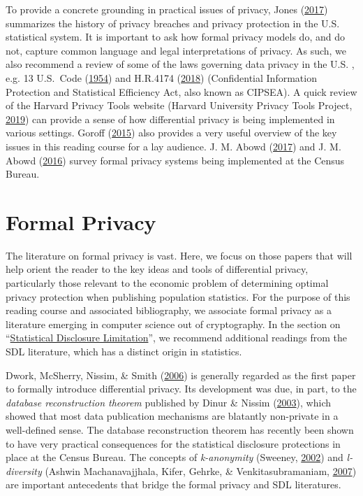 \documentclass[]{article}
\begin{document}
To provide a concrete grounding in practical issues of privacy, Jones
(\protect\hyperlink{ref-jones:2017}{2017}) summarizes the history of
privacy breaches and privacy protection in the U.S. statistical system.
It is important to ask how formal privacy models do, and do not, capture
common language and legal interpretations of privacy. As such, we also
recommend a review of some of the laws governing data privacy in the
U.S. , e.g. 13 U.S.~Code (\protect\hyperlink{ref-title13}{1954}) and
H.R.4174 (\protect\hyperlink{ref-cipsea}{2018}) (Confidential
Information Protection and Statistical Efficiency Act, also known as
CIPSEA). A quick review of the Harvard Privacy Tools website (Harvard
University Privacy Tools Project,
\protect\hyperlink{ref-Harvard:PrivacyTools}{2019}) can provide a sense
of how differential privacy is being implemented in various settings.
Goroff (\protect\hyperlink{ref-Goroff2015}{2015}) also provides a very
useful overview of the key issues in this reading course for a lay
audience. J. M. Abowd (\protect\hyperlink{ref-Abowd:JPC:2017}{2017}) and
J. M. Abowd (\protect\hyperlink{ref-abowd:fcsm:2016}{2016}) survey
formal privacy systems being implemented at the Census Bureau.

\hypertarget{formal-privacy}{\section{Formal
Privacy}\label{formal-privacy}}

The literature on formal privacy is vast. Here, we focus on those papers
that will help orient the reader to the key ideas and tools of
differential privacy, particularly those relevant to the economic
problem of determining optimal privacy protection when publishing
population statistics. For the purpose of this reading course and
associated bibliography, we associate formal privacy as a literature
emerging in computer science out of cryptography. In the section on
``\protect\hyperlink{statistical-disclosure-limitation}{Statistical
Disclosure Limitation}'', we recommend additional readings from the SDL
literature, which has a distinct origin in statistics.

Dwork, McSherry, Nissim, \& Smith
(\protect\hyperlink{ref-Dworketal:2006}{2006}) is generally regarded as
the first paper to formally introduce differential privacy. Its
development was due, in part, to the \emph{database reconstruction
theorem} published by Dinur \& Nissim
(\protect\hyperlink{ref-Dinur:2003:RIW:773153.773173}{2003}), which
showed that most data publication mechanisms are blatantly non-private
in a well-defined sense. The database reconstruction theorem has
recently been shown to have very practical consequences for the
statistical disclosure protections in place at the Census Bureau. The
concepts of \emph{k-anonymity} (Sweeney,
\protect\hyperlink{ref-sweeney:2002}{2002}) and \emph{l-diversity}
(Ashwin Machanavajjhala, Kifer, Gehrke, \& Venkitasubramaniam,
\protect\hyperlink{ref-Machanavajjhala:2007:LDP:1217299.1217302}{2007})
are important antecedents that bridge the formal privacy and SDL
literatures.
\end{document}
